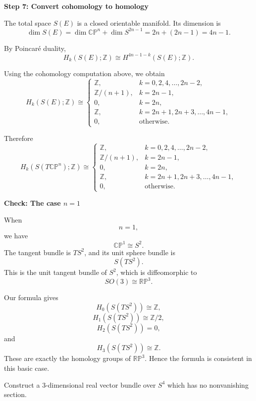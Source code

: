 \begin{solution}
\medskip
\noindent\textbf{Step 7: Convert cohomology to homology}\par
\smallskip


The total space \(S(E)\) is a closed orientable manifold. Its dimension is
\[
\dim S(E)
=
\dim \mathbb{CP}^n+\dim S^{2n-1}
=
2n+(2n-1)
=
4n-1.
\]

By Poincar\'e duality,
\[
H_k(S(E);\mathbb Z)
\cong
H^{4n-1-k}(S(E);\mathbb Z).
\]

Using the cohomology computation above, we obtain
\[
H_k(S(E);\mathbb Z)\cong
\begin{cases}
	\mathbb Z, & k=0,2,4,\ldots,2n-2,\\[1mm]
	\mathbb Z/(n+1), & k=2n-1,\\[1mm]
	0, & k=2n,\\[1mm]
	\mathbb Z, & k=2n+1,2n+3,\ldots,4n-1,\\[1mm]
	0, & \text{otherwise}.
\end{cases}
\]

Therefore
\[
\boxed{
	H_k(S(T\mathbb{CP}^n);\mathbb Z)\cong
	\begin{cases}
		\mathbb Z, & k=0,2,4,\ldots,2n-2,\\[1mm]
		\mathbb Z/(n+1), & k=2n-1,\\[1mm]
		0, & k=2n,\\[1mm]
		\mathbb Z, & k=2n+1,2n+3,\ldots,4n-1,\\[1mm]
		0, & \text{otherwise}.
	\end{cases}
}
\]


\medskip
\noindent\textbf{Check: The case \(n=1\)}\par
\smallskip


When
\[
n=1,
\]
we have
\[
\mathbb{CP}^1\cong S^2.
\]
The tangent bundle is \(TS^2\), and its unit sphere bundle is
\[
S(TS^2).
\]
This is the unit tangent bundle of \(S^2\), which is diffeomorphic to
\[
SO(3)\cong \mathbb{RP}^3.
\]

Our formula gives
\[
H_0(S(TS^2))\cong \mathbb Z,
\]
\[
H_1(S(TS^2))\cong \mathbb Z/2,
\]
\[
H_2(S(TS^2))=0,
\]
and
\[
H_3(S(TS^2))\cong \mathbb Z.
\]
These are exactly the homology groups of \(\mathbb{RP}^3\). Hence the formula is
consistent in this basic case.
\end{solution}

\begin{problem}
Construct a \(3\)-dimensional real vector bundle over \(S^4\) which has no
nonvanishing section.

\par

\noindent
\end{problem}

